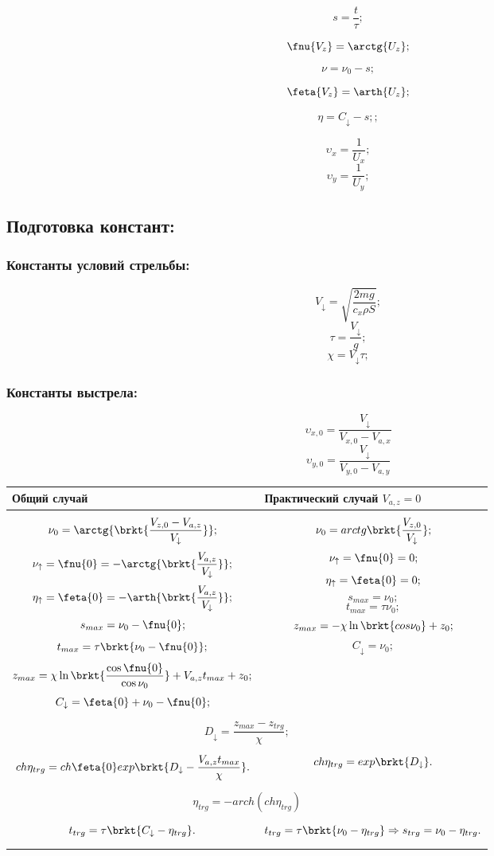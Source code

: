 $$s = \frac{t}{\tau};$$

$$\fnu{V_z} = \arctg{U_z};$$

$$\nu = \nu_0 - s;$$

$$\feta{V_z} = \arth{U_z};$$

$$\eta = C_\downarrow - s;;$$

$$\upsilon_x = \frac{1}{U_x};$$
$$\upsilon_y = \frac{1}{U_y};$$

\subsection{Подготовка констант:}

\subsubsection{Константы условий стрельбы:}

$$V_{\downarrow}=\sqrt{\frac{2mg}{c_{x} \rho S}};$$
$$\tau =\frac{V_\downarrow}{g};$$
$$\chi = V_\downarrow \tau;$$

\subsubsection{Константы выстрела:}
$$\upsilon_{x,0} = \frac{V_\downarrow}{V_{x,0} - V_{a,x}}$$
$$\upsilon_{y,0} = \frac{V_\downarrow}{V_{y,0} - V_{a,y}}$$


\begin{tabular}[t]{|p{80mm}|p{80mm}|}
\hline
Общий случай
&
Практический случай $V_{a,z}=0$
\\ \hline

$$\nu_{0} = \arctg{ \brkt{ \frac{V_{z,0} - V_{a,z}}{V_\downarrow} } };$$ 
$$\nu_\uparrow = \fnu{0} = -\arctg{ \brkt{ \frac{V_{a,z}}{V_\downarrow} }};$$
$$\eta_\uparrow = \feta{0} = -\arth{ \brkt{ \frac{V_{a,z}}{V_\downarrow} }};$$
$$s_{max}= \nu_{0} - \fnu{0};$$
$$t_{max}= \tau \brkt{ \nu_{0} - \fnu{0} };$$
$$z_{max} = \chi \ln \brkt{ \frac{\cos \fnu{0}}{\cos \nu_{0}} } + V_{a,z}t_{max} + z_0;$$
$$C_\downarrow = \feta{0} + \nu_0 - \fnu{0};$$
&
$$\nu_{0} = arctg \brkt{ \frac{V_{z,0}}{V_\downarrow} };$$
$$\nu_\uparrow = \fnu{0} = 0;$$
$$\eta_\uparrow = \feta{0} = 0;$$
$$s_{max}= \nu_{0};$$
$$t_{max}= \tau \nu_{0};$$
$$z_{max} = - \chi \ln \brkt{ cos \nu_{0} } + z_0;$$ 
$$C_\downarrow =  \nu_{0};$$
\\
\multicolumn{2}{|p{160mm}|}{
	$$D_\downarrow = \frac{z_{max} - z_{trg}}{\chi};$$
}
\\
$$ch \eta_{trg} = ch \feta{0} exp \brkt{D_\downarrow  -\frac{V_{a,z}t_{max}}{\chi} }.$$
&
$$ch \eta_{trg} = exp \brkt{ D_\downarrow }.$$
\\
\multicolumn{2}{|p{160mm}|}{
	$$\eta_{trg} = - arch(ch \eta_{trg})$$
}
\\
$$t_{trg} = \tau \brkt{ C_\downarrow - \eta_{trg} }.$$
&
$$t_{trg} = \tau \brkt{ \nu_0 - \eta_{trg} } \Rightarrow s_{trg} = \nu_0 - \eta_{trg}.$$
\\ \hline
\end{tabular}

